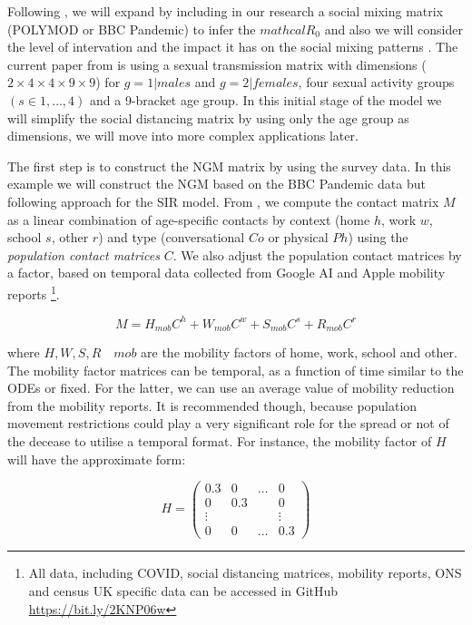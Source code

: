 \documentclass[12pt]{article}
\begin{document}
Following \cite{Fumanelli:2012, Baguelin:2013, Klepac2020}, we will expand \cite{Gareth:2013} by including in our research a social mixing matrix (POLYMOD or BBC Pandemic) to infer the $mathcal{R}_{0}$ and also we will consider the level of intervation and the impact it has on the social mixing patterns \cite{Kiesha:2017}. The current paper from \cite{Gareth:2013} is using a sexual transmission matrix with dimensions ($2 \times 4 \times 4 \times 9 \times 9$) for $g=1|males$ and $g=2|females$, four sexual activity groups $(s\in {1, \dots ,4})$ and a 9-bracket age group. In this initial stage of the model we will simplify the social distancing matrix by using only the age group as dimensions, we will move into more complex applications later.

The first step is to construct the NGM matrix \cite{Diekmann:2010} by using the survey data. In this example we will construct the NGM based on the BBC Pandemic data but following \cite{Fumanelli:2012} approach for the SIR model. From \cite{Klepac2020}, we compute the contact matrix $M$ as a linear combination of age-specific contacts by context (home $h$, work $w$, school $s$, other $r$) and type (conversational $Co$ or physical $Ph$) using the \textit{population contact matrices} $C$. We also adjust the population contact matrices by a factor, based on temporal data collected from Google AI and Apple mobility reports \footnote{All data, including COVID, social distancing matrices, mobility reports, ONS and census UK specific data can be accessed in GitHub  \url{https://bit.ly/2KNP06w}}.

\begin{equation}
M = H_{mob}C^{h} + W_{mob}C^{w} + S_{mob}C^{s} + R_{mob}C^{r}
\end{equation}

where $H, W, S, R \quad {mob}$ are the mobility factors of home, work, school and other. The mobility factor matrices can be temporal, as a function of time similar to the ODEs or fixed. For the latter, we can use an average value of mobility reduction from the mobility reports. It is recommended though, because population movement restrictions could play a very significant role for the spread or not of the decease to utilise a temporal format. For instance, the mobility factor of $H$ will have the approximate form:

\begin{equation*}
H=
\begin{pmatrix}
0.3 & 0 & \dots & 0\\
0 & 0.3 &  & 0\\
\vdots &  &  & \vdots  \\
0 &  0 & \dots & 0.3
\end{pmatrix}
\end{equation*}





\end{document}
